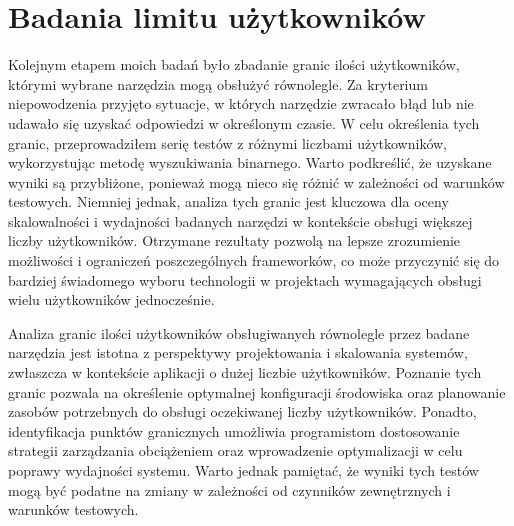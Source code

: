 \section{Badania limitu użytkowników}

Kolejnym etapem moich badań było zbadanie granic ilości użytkowników, którymi wybrane narzędzia mogą obsłużyć równolegle.
Za kryterium niepowodzenia przyjęto sytuacje, w których narzędzie zwracało błąd lub nie udawało się uzyskać odpowiedzi w określonym czasie.
W celu określenia tych granic, przeprowadziłem serię testów z różnymi liczbami użytkowników, wykorzystując metodę wyszukiwania binarnego.
Warto podkreślić, że uzyskane wyniki są przybliżone, ponieważ mogą nieco się różnić w zależności od warunków testowych.
Niemniej jednak, analiza tych granic jest kluczowa dla oceny skalowalności i wydajności badanych narzędzi w kontekście obsługi większej liczby użytkowników.
Otrzymane rezultaty pozwolą na lepsze zrozumienie możliwości i ograniczeń poszczególnych frameworków, co może przyczynić się do bardziej świadomego wyboru technologii w projektach wymagających obsługi wielu użytkowników jednocześnie.

Analiza granic ilości użytkowników obsługiwanych równolegle przez badane narzędzia jest istotna z perspektywy projektowania i skalowania systemów, zwłaszcza w kontekście aplikacji o dużej liczbie użytkowników.
Poznanie tych granic pozwala na określenie optymalnej konfiguracji środowiska oraz planowanie zasobów potrzebnych do obsługi oczekiwanej liczby użytkowników.
Ponadto, identyfikacja punktów granicznych umożliwia programistom dostosowanie strategii zarządzania obciążeniem oraz wprowadzenie optymalizacji w celu poprawy wydajności systemu.
Warto jednak pamiętać, że wyniki tych testów mogą być podatne na zmiany w zależności od czynników zewnętrznych i warunków testowych.




